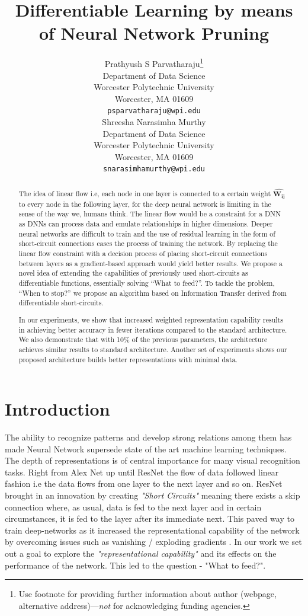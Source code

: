 \documentclass{article}
\title{Differentiable Learning by means of Neural Network Pruning}
\author{
  Prathyush S Parvatharaju\thanks{Use footnote for providing further
    information about author (webpage, alternative
    address)---\emph{not} for acknowledging funding agencies.} \\
  Department of Data Science\\
  Worcester Polytechnic University\\
  Worcester, MA 01609 \\
  \texttt{psparvatharaju@wpi.edu} \\
   \And
 Shreesha Narasimha Murthy \\
  Department of Data Science\\
  Worcester Polytechnic University\\
  Worcester, MA 01609 \\
  \texttt{snarasimhamurthy@wpi.edu} \\
}
\let\oldhat\hat
\renewcommand{\hat}[1]{\oldhat{\mathbf{#1}}}
\begin{document}
\maketitle

\begin{abstract}
The idea of linear flow i.e, each node in one layer is connected to a certain weight $\hat{W_{ij}}$ to every node in the following layer, for the deep neural network is limiting in the sense of the way we, humans think. The linear flow would be a constraint for a DNN as DNNs can process data and emulate relationships in higher dimensions. Deeper neural networks are difficult to train and the use of residual learning in the form of short-circuit connections eases the process of training the network. By replacing the linear flow constraint with a decision process of placing short-circuit connections between layers as a gradient-based approach would yield better results. We propose a novel idea of extending the capabilities of previously used short-circuits as differentiable functions, essentially solving “What to feed?”. To tackle the problem, “When to stop?” we propose an algorithm based on Information Transfer derived from differentiable short-circuits. 

In our experiments, we show that increased weighted representation capability results in achieving better accuracy in fewer iterations compared to the standard architecture. We also demonstrate that with 10\% of the previous parameters, the architecture achieves similar results to standard architecture. Another set of experiments shows our proposed architecture builds better representations with minimal data.
\end{abstract}




\section{Introduction}
The ability to recognize patterns and develop strong relations among them has made Neural Network supersede state of the art machine learning techniques. The depth of representations is of central importance for many visual recognition tasks. Right from Alex Net \cite{Krizhevsky2012ImageNetCW} up until ResNet \cite{He2016DeepRL} the flow of data followed linear fashion i.e the data flows from one layer to the next layer and so on. ResNet brought in an innovation by creating \emph{"Short Circuits"} meaning there exists a skip connection where, as usual, data is fed to the next layer and in certain circumstances, it is fed to the layer after its immediate next. This paved way to train deep-networks as it increased the representational capability of the network by overcoming issues such as vanishing / exploding gradients \cite{Bengio1994LearningLD, Glorot2010UnderstandingTD}. In our work we set out a goal to explore the \emph{"representational capability"} and its effects on the performance of the network. This led to the question - "What to feed?".
\end{document}
